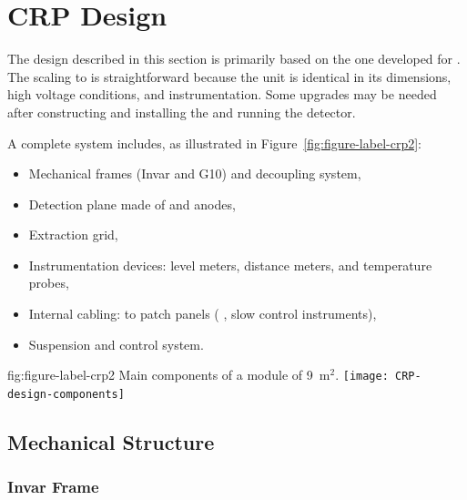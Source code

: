 \section{CRP Design}
\label{ch:dp-crp-design}
The design described in this section is primarily based on the one developed for . The scaling to   is straightforward because the  unit is identical in its dimensions, high voltage conditions, and instrumentation. Some upgrades may be needed after constructing and installing the  and running the detector.

A complete  system includes, as illustrated in Figure~\ref{fig:figure-label-crp2}:
\begin{itemize}
\item Mechanical frames (Invar and G10) and decoupling system,
\item Detection plane made of  and anodes,
\item Extraction grid,
\item Instrumentation devices: level meters, distance meters, and temperature probes,
\item Internal cabling: to patch panels ( , slow control instruments),
\item Suspension and control system.
\end{itemize}

\begin{dunefigure}{fig:figure-label-crp2}
{Main components of a  module of  \SI{9}{m$^{2}$}.}
\texttt{[image: CRP-design-components]}
\end{dunefigure}

\subsection{Mechanical Structure}
\label{sec:fddp-crp-mechanics}
\subsubsection{Invar Frame}

